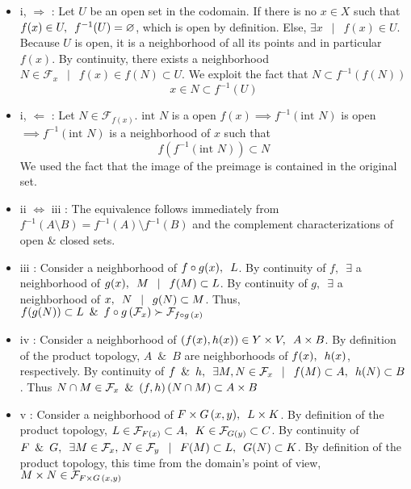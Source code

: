 \begin{myproof}
	\begin{itemize}
		\item i, $\Rightarrow$ : Let $U$ be an open set in the codomain. If there is no $x \in X$ such that $f(x) \in U, \enskip f^{-1}(U) = \emptyset{}$, which is open by definition. \enskip Else, $\exists x \enspace \mid \enspace f(x) \in U$. \enskip Because $U$ is open, it is a neighborhood of all its points and in particular $f(x)$. By continuity, there exists a neighborhood $N \in \mathcal{F}_x \enspace \mid \enspace f(x) \in f(N) \subset U$. We exploit the fact that $N \subset f^{-1}(f(N))$
			$$x \in N \subset f^{-1}(U)$$
		\item i, $\Leftarrow$ : Let $N\in \mathcal{F}_{f(x)}$. \enskip $\textrm{int } N$ is a open $f(x) \implies f^{-1}(\textrm{int } N)$ is open $\implies f^{-1}(\textrm{int } N) $ is a neighborhood of $x$ such that
		$$f(f^{-1}(\textrm{int } N)) \subset N$$
		We used the fact that the image of the preimage is contained in the original set.
		\item ii $\Leftrightarrow$ iii : The equivalence follows immediately from $f^{-1}(A \setminus B) = f^{-1}(A)\setminus f^{-1}(B)$ and the complement characterizations of open \& closed sets.
		\item iii : Consider a neighborhood of $f \circ g (x), \enskip L$. \enskip By continuity of $f, \enspace \exists$ a neighborhood of $g(x), \enskip M \enspace \mid \enspace f(M) \subset L$. By continuity of $g, \enspace \exists $ a neighborhood of $x, \enskip N \enspace \mid \enspace g(N) \subset M$. \enskip Thus, $f(g(N)) \subset L \enspace \& \enspace f \circ g \thinspace (\mathcal{F}_x) \succ \mathcal{F}_{f \circ g \thinspace (x)}$
		\item iv : Consider a neighborhood of $(f(x), h(x)) \in Y \times V, \enskip A\times B$. \enskip By definition of the product topology, $A \enspace \& \enspace B $ are neighborhoods of $f(x), \enskip h(x) $, respectively. \enskip By continuity of $f \enspace \& \enspace h, \enspace \exists M, N \in \mathcal{F}_x \enspace \mid \enspace f(M) \subset A, \enskip h(N) \subset B$. \enskip Thus $N \cap M \in \mathcal{F}_x \enspace \& \enspace (f, h) \thinspace (N \cap M) \subset A \times B$
		\item v : Consider a neighborhood of $F \times G \thinspace (x, y), \enskip L \times K$. \enskip By definition of the product topology, $L \in \mathcal{F}_{F(x)} \subset A, \enskip K \in \mathcal{F}_{G(y)} \subset C$. \enskip By continuity of $F \enspace \& \enspace G, \enspace \exists M \in \mathcal{F}_x, \thinspace N\in \mathcal{F}_y \enspace \mid \enspace F(M) \subset L, \enskip G(N) \subset K$. \enspace By definition of the product topology, this time from the domain's point of view, $M \times N\in \mathcal{F}_{F\times G \thinspace (x, y)}$
	\end{itemize}
\end{myproof}


